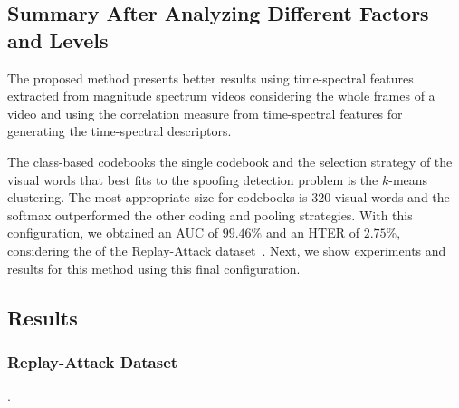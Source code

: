 \subsection{Summary After Analyzing Different Factors and Levels}
{The proposed method presents better results using time-spectral features extracted from magnitude spectrum videos considering the whole frames of a video and using the correlation measure from time-spectral features for generating the time-spectral descriptors.}

{The class-based codebooks  the single codebook and the selection strategy of the visual words that best fits to the spoofing detection problem is the $k$-means clustering. The most appropriate size for codebooks is $320$ visual words and the softmax outperformed the other coding and pooling strategies. With this configuration, we obtained an AUC of $99.46\%$ and an HTER of $2.75\%$, considering the  of the Replay-Attack dataset~\cite{Chingovska:BIOSEG:2012}. Next, we show experiments and results for this method using this final configuration.}

\subsection{Results}\label{subsec:soa_comparison}

\subsubsection{Replay-Attack Dataset}\label{subsec:ra_results}

.

